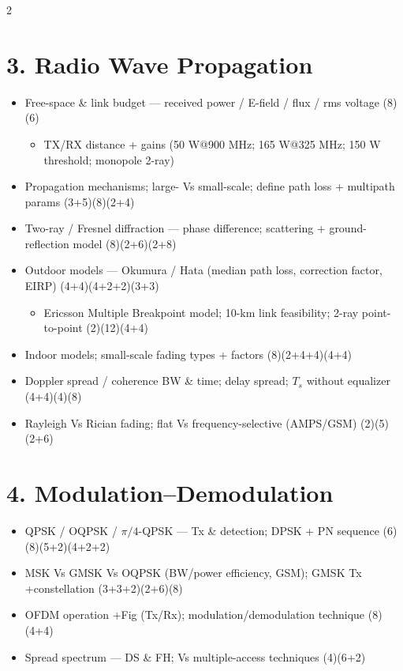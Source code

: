 \documentclass[10pt]{article}
\begin{document}
\begin{multicols}{2}
\section*{3. Radio Wave Propagation}
\begin{itemize}
  \item Free-space \& link budget --- received power / E-field / flux / rms voltage \hfill (8)(6)
    \begin{itemize}
      \item TX/RX distance + gains (50 W@900 MHz; 165 W@325 MHz; 150 W threshold; monopole 2-ray)
    \end{itemize}
  \item Propagation mechanisms; large- Vs small-scale; define path loss + multipath params \hfill (3+5)(8)(2+4)
  \item Two-ray / Fresnel diffraction --- phase difference; scattering + ground-reflection model \hfill (8)(2+6)(2+8)
  \item Outdoor models --- Okumura / Hata (median path loss, correction factor, EIRP) \hfill (4+4)(4+2+2)(3+3)
    \begin{itemize}
      \item Ericsson Multiple Breakpoint model; 10-km link feasibility; 2-ray point-to-point \hfill (2)(12)(4+4)
    \end{itemize}
  \item Indoor models; small-scale fading types + factors \hfill (8)(2+4+4)(4+4)
  \item Doppler spread / coherence BW \& time; delay spread; $T_s$ without equalizer \hfill (4+4)(4)(8)
  \item Rayleigh Vs Rician fading; flat Vs frequency-selective (AMPS/GSM) \hfill (2)(5)(2+6)
\end{itemize}

\section*{4. Modulation--Demodulation}
\begin{itemize}
  \item QPSK / OQPSK / $\pi/4$-QPSK --- Tx \& detection; DPSK + PN sequence \hfill (6)(8)(5+2)(4+2+2)
  \item MSK Vs GMSK Vs OQPSK (BW/power efficiency, GSM); GMSK Tx +constellation \hfill (3+3+2)(2+6)(8)
  \item OFDM operation +Fig (Tx/Rx); modulation/demodulation technique \hfill (8)(4+4)
  \item Spread spectrum --- DS \& FH; Vs multiple-access techniques \hfill (4)(6+2)
\end{itemize}


\end{multicols}
\end{document}
